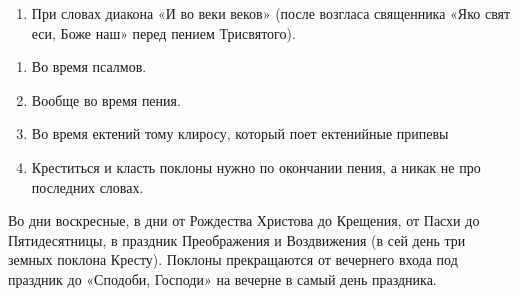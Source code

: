 \begin{mymulticols}
\begin{enumerate}
\item При словах диакона «И во веки веков» (после возгласа священника «Яко свят еси, Боже наш» перед пением Трисвятого). 


\end{enumerate}







\begin{enumerate}


\item Во время псалмов.

\item Вообще во время пения.

\item Во время ектений тому клиросу, который поет ектенийные припевы

\item Креститься и класть поклоны нужно по окончании пения, а никак не про последних словах.


\end{enumerate}












Во дни воскресные, в дни от Рождества Христова до Крещения, от Пасхи до Пятидесятницы, в праздник Преображения и Воздвижения (в сей день три земных поклона Кресту). Поклоны прекращаются от вечернего входа под праздник до «Сподоби, Господи» на вечерне в самый день праздника.

\end{mymulticols}

\mychapterending

 
